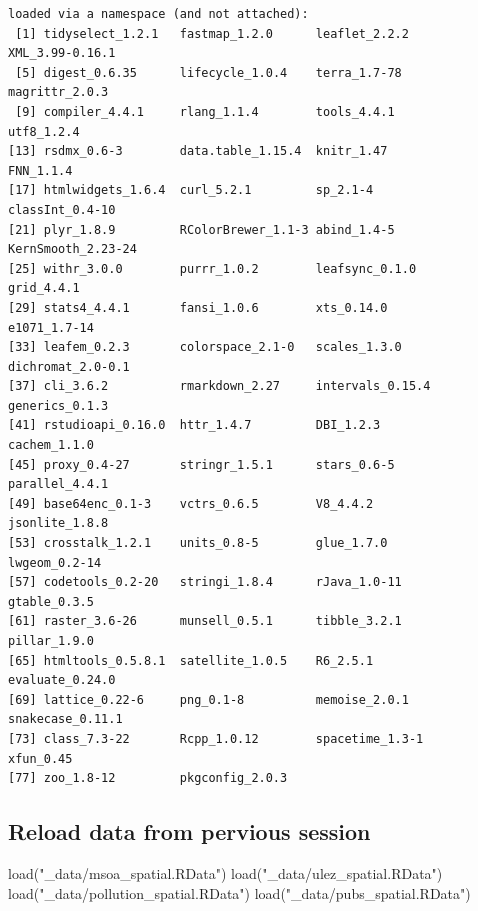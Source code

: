 \documentclass[
  letterpaper,
  DIV=11,
  numbers=noendperiod]{scrreprt}
\newenvironment{Shaded}{\begin{snugshade}}{\end{snugshade}}
\newcommand{\FunctionTok}[1]{\textcolor[rgb]{0.28,0.35,0.67}{#1}}
\newcommand{\NormalTok}[1]{\textcolor[rgb]{0.00,0.23,0.31}{#1}}
\newcommand{\StringTok}[1]{\textcolor[rgb]{0.13,0.47,0.30}{#1}}
\begin{document}
\begin{verbatim}
loaded via a namespace (and not attached):
 [1] tidyselect_1.2.1   fastmap_1.2.0      leaflet_2.2.2      XML_3.99-0.16.1   
 [5] digest_0.6.35      lifecycle_1.0.4    terra_1.7-78       magrittr_2.0.3    
 [9] compiler_4.4.1     rlang_1.1.4        tools_4.4.1        utf8_1.2.4        
[13] rsdmx_0.6-3        data.table_1.15.4  knitr_1.47         FNN_1.1.4         
[17] htmlwidgets_1.6.4  curl_5.2.1         sp_2.1-4           classInt_0.4-10   
[21] plyr_1.8.9         RColorBrewer_1.1-3 abind_1.4-5        KernSmooth_2.23-24
[25] withr_3.0.0        purrr_1.0.2        leafsync_0.1.0     grid_4.4.1        
[29] stats4_4.4.1       fansi_1.0.6        xts_0.14.0         e1071_1.7-14      
[33] leafem_0.2.3       colorspace_2.1-0   scales_1.3.0       dichromat_2.0-0.1 
[37] cli_3.6.2          rmarkdown_2.27     intervals_0.15.4   generics_0.1.3    
[41] rstudioapi_0.16.0  httr_1.4.7         DBI_1.2.3          cachem_1.1.0      
[45] proxy_0.4-27       stringr_1.5.1      stars_0.6-5        parallel_4.4.1    
[49] base64enc_0.1-3    vctrs_0.6.5        V8_4.4.2           jsonlite_1.8.8    
[53] crosstalk_1.2.1    units_0.8-5        glue_1.7.0         lwgeom_0.2-14     
[57] codetools_0.2-20   stringi_1.8.4      rJava_1.0-11       gtable_0.3.5      
[61] raster_3.6-26      munsell_0.5.1      tibble_3.2.1       pillar_1.9.0      
[65] htmltools_0.5.8.1  satellite_1.0.5    R6_2.5.1           evaluate_0.24.0   
[69] lattice_0.22-6     png_0.1-8          memoise_2.0.1      snakecase_0.11.1  
[73] class_7.3-22       Rcpp_1.0.12        spacetime_1.3-1    xfun_0.45         
[77] zoo_1.8-12         pkgconfig_2.0.3   
\end{verbatim}

\hypertarget{reload-data-from-pervious-session}{%
\subsection*{Reload data from pervious
session}\label{reload-data-from-pervious-session}}

\begin{Shaded}
\begin{Highlighting}[]
\FunctionTok{load}\NormalTok{(}\StringTok{"\_data/msoa\_spatial.RData"}\NormalTok{)}
\FunctionTok{load}\NormalTok{(}\StringTok{"\_data/ulez\_spatial.RData"}\NormalTok{)}
\FunctionTok{load}\NormalTok{(}\StringTok{"\_data/pollution\_spatial.RData"}\NormalTok{)}
\FunctionTok{load}\NormalTok{(}\StringTok{"\_data/pubs\_spatial.RData"}\NormalTok{)}
\end{Highlighting}
\end{Shaded}
\end{document}
